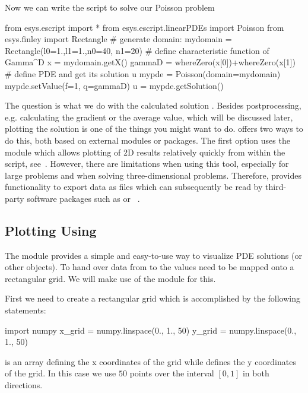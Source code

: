 Now we can write the script to solve our Poisson problem
\begin{python}
  from esys.escript import *
  from esys.escript.linearPDEs import Poisson
  from esys.finley import Rectangle
  # generate domain:
  mydomain = Rectangle(l0=1.,l1=1.,n0=40, n1=20)
  # define characteristic function of Gamma^D
  x = mydomain.getX()
  gammaD = whereZero(x[0])+whereZero(x[1])
  # define PDE and get its solution u
  mypde = Poisson(domain=mydomain)
  mypde.setValue(f=1, q=gammaD)
  u = mypde.getSolution()
\end{python}
The question is what we do with the calculated solution .
Besides postprocessing, e.g. calculating the gradient or the average value,
which will be discussed later, plotting the solution is one of the things you
might want to do.
\escript offers two ways to do this, both based on external modules or packages.
The first option uses the \MATPLOTLIB module which allows plotting of 2D
results relatively quickly from within the \PYTHON script, see~\cite{matplotlib}.
However, there are limitations when using this tool, especially for large
problems and when solving three-dimensional problems.
Therefore, \escript provides functionality to export data as files which can
subsequently be read by third-party software packages such as
\mayavi\cite{mayavi} or \VisIt~\cite{VisIt}.

\subsection{Plotting Using \MATPLOTLIB}
The \MATPLOTLIB module provides a simple and easy-to-use way to visualize PDE
solutions (or other \Data objects).
To hand over data from \escript to \MATPLOTLIB the values need to be mapped onto
a rectangular grid. We will make use of the \numpy module for this.

First we need to create a rectangular grid which is accomplished by the following statements:
\begin{python}
  import numpy
  x_grid = numpy.linspace(0., 1., 50)
  y_grid = numpy.linspace(0., 1., 50)
\end{python}
 is an array defining the x coordinates of the grid while
 defines the y coordinates of the grid.
In this case we use $50$ points over the interval $[0,1]$ in both directions. 

